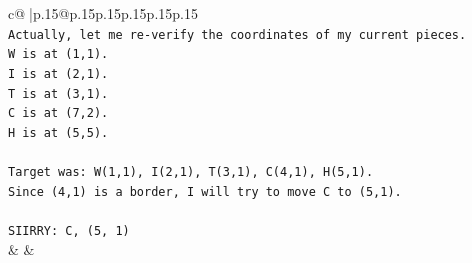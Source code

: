 \documentclass{article}
\begin{document}
{\begin{supertabular}{c@{$\;$}|p{.15\linewidth}@{}p{.15\linewidth}p{.15\linewidth}p{.15\linewidth}p{.15\linewidth}p{.15\linewidth}}
{{{\\ 
\texttt{Actually, let me re{-}verify the coordinates of my current pieces.} \\
\texttt{W is at (1,1).} \\
\texttt{I is at (2,1).} \\
\texttt{T is at (3,1).} \\
\texttt{C is at (7,2).} \\
\texttt{H is at (5,5).} \\
\\ 
\texttt{Target was: W(1,1), I(2,1), T(3,1), C(4,1), H(5,1).} \\
\texttt{Since (4,1) is a border, I will try to move C to (5,1).} \\
\\ 
\texttt{SIIRRY: C, (5, 1)} \\
            }
        }
    }
    & & \\ \\


\end{supertabular}}
\end{document}
